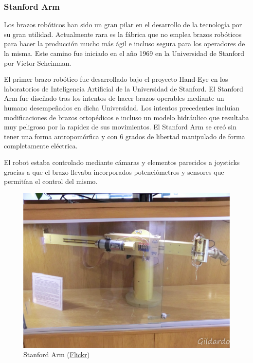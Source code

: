 \subsubsection{Stanford Arm}

Los brazos robóticos han sido un gran pilar en el desarrollo de la tecnología por su gran utilidad. Actualmente rara es la fábrica que no emplea brazos robóticos para hacer la producción mucho más ágil e incluso segura para los operadores de la misma. Este camino fue iniciado en el año 1969 en la Universidad de Stanford por Victor Scheinman.

\vspace{10px}

El primer brazo robótico fue desarrollado bajo el proyecto Hand-Eye en los laboratorios de Inteligencia Artificial de la Universidad de Stanford. El Stanford Arm fue diseñado tras los intentos de hacer brazos operables mediante un humano desempeñados en dicha Universidad. Los intentos precedentes incluían modificaciones de brazos ortopédicos e incluso un modelo hidráulico que resultaba muy peligroso por la rapidez de sus movimientos. El Stanford Arm se creó sin tener una forma antropomórfica y con 6 grados de libertad manipulado de forma completamente eléctrica.

\vspace{10px}

El robot estaba controlado mediante cámaras y elementos parecidos a joysticks gracias a que el brazo llevaba incorporados potenciómetros y sensores que permitían el control del mismo.

\begin{figure}[!h]
	\centering
	\includegraphics[scale=0.3]{./EtapaModerna/Imagenes/stanford_arm.jpg}
	\caption{Stanford Arm (\href{https://www.flickr.com/photos/gildardo/6186967797}{Flickr})}
	\label{fig:stanfordArm}
\end{figure}

